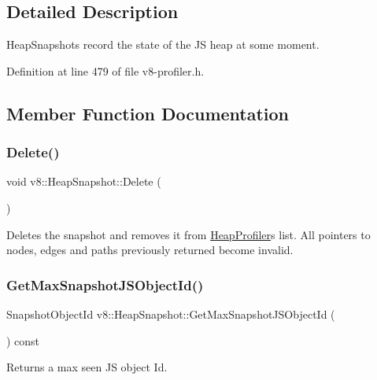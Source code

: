 \subsection{Detailed Description}
Heap\+Snapshots record the state of the JS heap at some moment. 

Definition at line 479 of file v8-\/profiler.\+h.



\subsection{Member Function Documentation}
\mbox{\label{classv8_1_1HeapSnapshot_aeaa6073009e4041839dff7a860d2548a}} 
\subsubsection{\texorpdfstring{Delete()}{Delete()}}
{\footnotesize\ttfamily void v8\+::\+Heap\+Snapshot\+::\+Delete (\begin{DoxyParamCaption}{ }\end{DoxyParamCaption})}

Deletes the snapshot and removes it from \mbox{\hyperlink{classv8_1_1HeapProfiler}{Heap\+Profiler}}\textquotesingle{}s list. All pointers to nodes, edges and paths previously returned become invalid. \mbox{\label{classv8_1_1HeapSnapshot_ab85fc78102f4e7a3c4f2bf66a3665908}} 
\subsubsection{\texorpdfstring{Get\+Max\+Snapshot\+J\+S\+Object\+Id()}{GetMaxSnapshotJSObjectId()}}
{\footnotesize\ttfamily Snapshot\+Object\+Id v8\+::\+Heap\+Snapshot\+::\+Get\+Max\+Snapshot\+J\+S\+Object\+Id (\begin{DoxyParamCaption}{ }\end{DoxyParamCaption}) const}

Returns a max seen JS object Id. \mbox{\label{classv8_1_1HeapSnapshot_ac5e9333d91030870b2648f2f8e9505d7}} 
